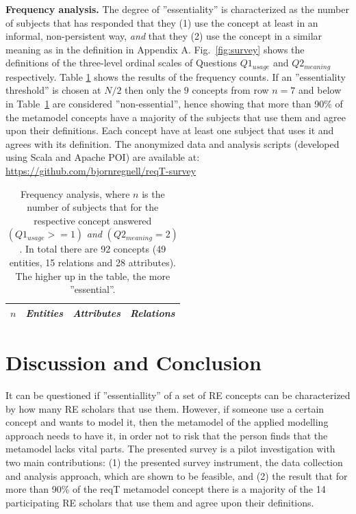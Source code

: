 \documentclass[a4paper]{llncs}
\begin{document}
\vspace{-0.6cm}
\noindent \textbf{Frequency analysis.} The degree of ''essentiality'' is characterized as the number of subjects that has responded that they (1) use the concept at least in an informal, non-persistent way, \textit{and} that they (2) use the concept in a similar meaning as in the definition in Appendix A. Fig.~\ref{fig:survey} shows the definitions of the three-level ordinal scales of Questions $Q1_{usage}$  and $Q2_{meaning}$ respectively. Table \ref{table:frequency} shows the results of the frequency counts.  
If an ''essentiality threshold'' is chosen at $N/2$ then only the $9$ concepts from row $n = 7$ and below in Table~\ref{table:frequency} are considered ''non-essential'', hence showing that more than 90\% of the metamodel concepts have a majority of the subjects that use them and agree upon their definitions. Each concept have at least one subject that uses it and agrees with its definition. {The anonymized data and analysis scripts (developed using Scala and Apache POI) are available at: \footnotesize\url{https://github.com/bjornregnell/reqT-survey}} 
\vspace{-0.4cm}
%
\begingroup
\setlength{\tabcolsep}{4pt} %
\renewcommand{\arraystretch}{1.35} %
\begin{table}
\centering
\fontsize{7}{8}\selectfont
\caption{Frequency analysis, where $n$ is the number of subjects that for the respective concept answered $(Q1_{usage}>= 1)$ \textit{and} $(Q2_{meaning} = 2)$. In total there are 92 concepts (49 entities, 15 relations and 28 attributes). The higher up in the table, the more ''essential''.}
\label{table:frequency}
\begin{tabular}{l | p{} | p{} | p{}}
\textit{$n$} & \textit{Entities} & \textit{Attributes} & \textit{Relations} \\ \hline

 \end{tabular}
\end{table}
\endgroup





\section{Discussion and Conclusion}\label{section:discussion}

It can be questioned if ''essentiallity'' of a set of RE concepts can be characterized by how many RE scholars that use them. However, if someone use a certain concept and wants to model it, then the metamodel of the applied modelling approach needs to have it, in order not to risk that the person finds that the metamodel lacks vital parts. The presented survey is a pilot investigation with two main contributions: (1) the presented survey instrument, the data collection and analysis approach, which are shown to be feasible, and (2) the result that for more than 90\% of the reqT metamodel concept there is a majority of the 14 participating RE scholars that use them and agree upon their definitions. 
\end{document}
